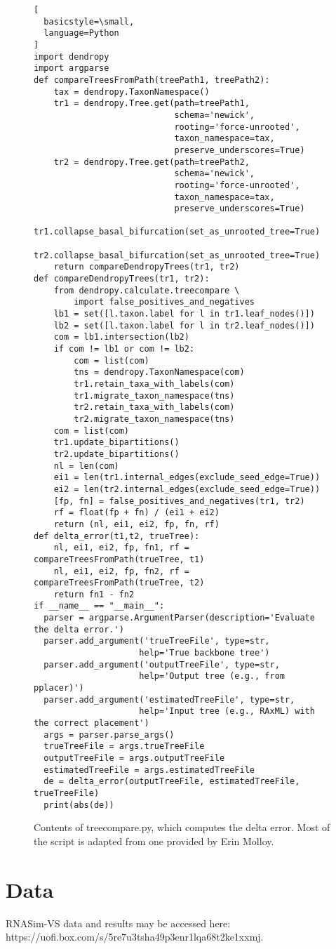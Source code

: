 \documentclass[10pt]{article}
\begin{document}
\begin{figure}
\begin{lstlisting}[
  basicstyle=\small,
  language=Python
]
import dendropy
import argparse
def compareTreesFromPath(treePath1, treePath2):
    tax = dendropy.TaxonNamespace()
    tr1 = dendropy.Tree.get(path=treePath1,
                            schema='newick',
                            rooting='force-unrooted',
                            taxon_namespace=tax,
                            preserve_underscores=True)
    tr2 = dendropy.Tree.get(path=treePath2,
                            schema='newick',
                            rooting='force-unrooted',
                            taxon_namespace=tax,
                            preserve_underscores=True)
    tr1.collapse_basal_bifurcation(set_as_unrooted_tree=True)
    tr2.collapse_basal_bifurcation(set_as_unrooted_tree=True)
    return compareDendropyTrees(tr1, tr2)
def compareDendropyTrees(tr1, tr2):
    from dendropy.calculate.treecompare \
        import false_positives_and_negatives
    lb1 = set([l.taxon.label for l in tr1.leaf_nodes()])
    lb2 = set([l.taxon.label for l in tr2.leaf_nodes()])
    com = lb1.intersection(lb2)
    if com != lb1 or com != lb2:
        com = list(com)
        tns = dendropy.TaxonNamespace(com)
        tr1.retain_taxa_with_labels(com)
        tr1.migrate_taxon_namespace(tns)
        tr2.retain_taxa_with_labels(com)
        tr2.migrate_taxon_namespace(tns)
    com = list(com)
    tr1.update_bipartitions()
    tr2.update_bipartitions()
    nl = len(com)
    ei1 = len(tr1.internal_edges(exclude_seed_edge=True))
    ei2 = len(tr2.internal_edges(exclude_seed_edge=True))
    [fp, fn] = false_positives_and_negatives(tr1, tr2)
    rf = float(fp + fn) / (ei1 + ei2)
    return (nl, ei1, ei2, fp, fn, rf)
def delta_error(t1,t2, trueTree):
    nl, ei1, ei2, fp, fn1, rf = compareTreesFromPath(trueTree, t1)
    nl, ei1, ei2, fp, fn2, rf = compareTreesFromPath(trueTree, t2)
    return fn1 - fn2
if __name__ == "__main__":
  parser = argparse.ArgumentParser(description='Evaluate the delta error.')
  parser.add_argument('trueTreeFile', type=str,
                     help='True backbone tree')
  parser.add_argument('outputTreeFile', type=str,
                     help='Output tree (e.g., from pplacer)')
  parser.add_argument('estimatedTreeFile', type=str,
                     help='Input tree (e.g., RAxML) with the correct placement')
  args = parser.parse_args()
  trueTreeFile = args.trueTreeFile
  outputTreeFile = args.outputTreeFile
  estimatedTreeFile = args.estimatedTreeFile
  de = delta_error(outputTreeFile, estimatedTreeFile, trueTreeFile)
  print(abs(de))
\end{lstlisting}
\caption{Contents of treecompare.py, which computes the delta error.
Most of the script is adapted from one provided by Erin Molloy.}
\end{figure}


\section{Data}

RNASim-VS data and results may be accessed here:\newline
https://uofi.box.com/s/5re7u3tsha49p3enr1lqa68t2ke1xxmj.
\end{document}
